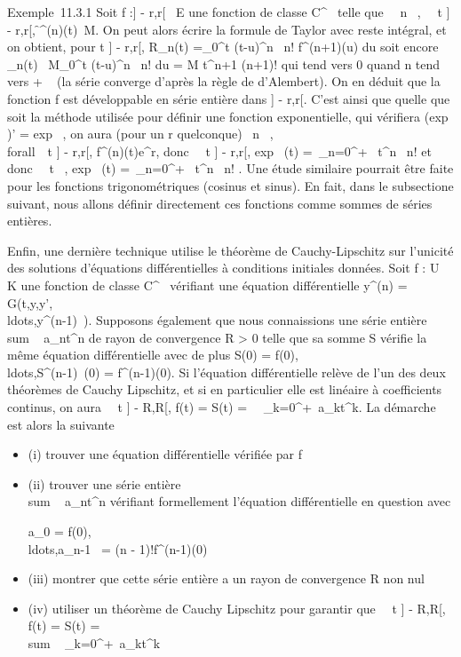 \documentclass[]{article}
\begin{document}
Exemple~11.3.1 Soit f :] - r,r[\rightarrow~ E une fonction de classe
C^\infty~ telle que \forall~~n \in {}~,
\forall~~t \in] - r,r[,
\f^(n)(t)\
\leq M. On peut alors écrire la formule de Taylor avec reste intégral, et
on obtient, pour t \in] - r,r[, R_n(t)
=\int  _0^t (t-u)^n~
\over n! f^(n+1)(u) du soit encore
\R_n(t)\ \leq
M\int  _0^t (t-u)^n~
\over n! du = M t^n+1 \over
(n+1)! qui tend vers 0 quand n tend vers + \infty~ (la série converge
d'après la règle de d'Alembert). On en déduit que la fonction f est
développable en série entière dans ] - r,r[. C'est ainsi que quelle
que soit la méthode utilisée pour définir une fonction exponentielle,
qui vérifiera (exp~ )'
= exp~ , on aura (pour un r quelconque)
\forall~n \in {}~, \\forall~~t \in] -
r,r[, f^(n)(t)\leq e^r, donc
\forall~~t \in] - r,r[,
exp~ (t) =\
\sum  _n=0^+\infty~ t^n~
\over n! et donc \forall~~t \in {}~,
exp~ (t) =\
\sum  _n=0^+\infty~ t^n~
\over n! . Une étude similaire pourrait être faite pour
les fonctions trigonométriques (cosinus et sinus). En fait, dans le
subsectione suivant, nous allons définir directement ces fonctions comme
sommes de séries entières.

Enfin, une dernière technique utilise le théorème de Cauchy-Lipschitz
sur l'unicité des solutions d'équations différentielles à conditions
initiales données. Soit f : U \rightarrow~ K une fonction de classe C^\infty~
vérifiant une équation différentielle y^(n) =
G(t,y,y',\\ldots,y^(n-1)~).
Supposons également que nous connaissions une série entière
\\sum ~
a_nt^n de rayon de convergence R > 0
telle que sa somme S vérifie la même équation différentielle avec de
plus S(0) =
f(0),\\ldots,S^(n-1)~(0)
= f^(n-1)(0). Si l'équation différentielle relève de l'un des
deux théorèmes de Cauchy Lipschitz, et si en particulier elle est
linéaire à coefficients continus, on aura \forall~~t
\in] - R,R[\bigcapU, f(t) = S(t) =\
\sum ~
_k=0^+\infty~a_kt^k. La démarche est alors
la suivante

\begin{itemize}
\item
  (i) trouver une équation différentielle vérifiée par f
\item
  (ii) trouver une série entière
  \\sum ~
  a_nt^n vérifiant formellement l'équation
  différentielle en question avec

  a_0 =
  f(0),\\ldots,a_n-1~
  = (n - 1)!f^(n-1)(0)
\item
  (iii) montrer que cette série entière a un rayon de convergence R non
  nul
\item
  (iv) utiliser un théorème de Cauchy Lipschitz pour garantir que
  \forall~~t \in] - R,R[\bigcapU, f(t) = S(t)
  = \\sum ~
  _k=0^+\infty~a_kt^k
\end{itemize}
\end{document}
